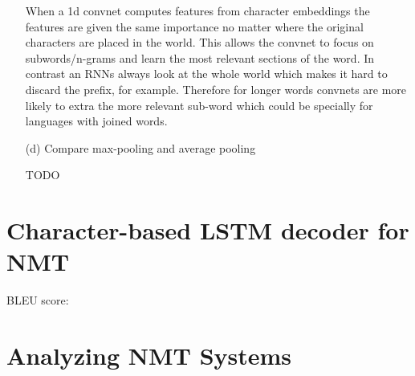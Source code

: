 \documentclass{article}
\begin{document}
\begin{enumerate}
When a 1d convnet computes features from character embeddings the features are given the same importance no matter where the original characters are placed in the world. This allows the convnet to focus on subwords/n-grams and learn the most relevant sections of the word. In contrast an RNNs always look at the whole world which makes it hard to discard the prefix, for example. Therefore for longer words convnets are more likely to extra the more relevant sub-word which could be specially for languages with joined words.

\item[(d)]{Compare max-pooling and average pooling}

TODO

\end{enumerate}

\clearpage


\section{Character-based LSTM decoder for NMT}

BLEU score:

\clearpage
\section{Analyzing NMT Systems}
\end{document}
